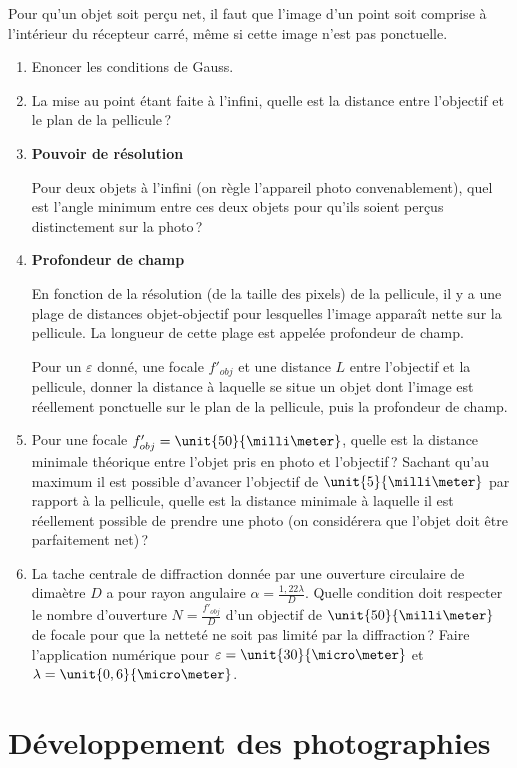 \documentclass[10pt,a4paper]{article}
\begin{document}
Pour qu'un objet soit perçu net, il faut que l'image d'un point soit comprise à l'intérieur du récepteur carré, même si cette image n'est pas ponctuelle.
\begin{enumerate}
\item Enoncer les conditions de Gauss.
\item La mise au point étant faite à l'infini, quelle est la distance entre l'objectif et le plan de la pellicule\,?
\smallskip
\item \textbf{Pouvoir de résolution}

Pour deux objets à l'infini (on règle l'appareil photo convenablement), quel est l'angle minimum entre ces deux objets pour qu'ils soient perçus 
distinctement sur la photo\,?
\smallskip
\item \textbf{Profondeur de champ}

En fonction de la résolution (de la taille des pixels) de la pellicule, il y a une plage de distances objet-objectif pour lesquelles l'image apparaît nette
sur la pellicule. La longueur de cette plage est appelée profondeur de champ.

Pour un $\varepsilon$ donné, une focale $f'_{obj}$ et une distance $L$ entre l'objectif et la pellicule, donner la distance à laquelle se 
situe un objet dont l'image est réellement ponctuelle sur le plan de la pellicule, puis la profondeur de champ.
\item Pour une focale $f'_{obj}=\unit{50}{\milli\meter}$, quelle est la distance minimale théorique entre l'objet pris en photo et l'objectif\,? Sachant qu'au 
maximum il est possible d'avancer l'objectif de $\unit{5}{\milli\meter}$ par rapport à la pellicule, quelle est la distance minimale à laquelle il est 
réellement possible de prendre une photo (on considérera que l'objet doit être parfaitement net)\,?
\item La tache centrale de diffraction donnée par une ouverture circulaire de dimaètre $D$ a pour rayon angulaire $\alpha=\frac{1,22\lambda}{D}$. Quelle
condition doit respecter le nombre d'ouverture $N=\frac{f'_{obj}}{D}$ d'un objectif de $\unit{50}{\milli\meter}$ de focale pour que la netteté ne soit pas 
limité par la diffraction\,? Faire l'application numérique pour $\varepsilon=\unit{30}{\micro\meter}$ et $\lambda=\unit{0,6}{\micro\meter}$.
\end{enumerate}
\pagebreak
\section{Développement des photographies}
\end{document}
